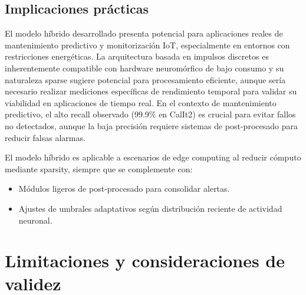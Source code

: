 \subsection{Implicaciones prácticas}
El modelo híbrido desarrollado presenta potencial para aplicaciones reales de mantenimiento predictivo y monitorización IoT, especialmente en entornos con restricciones energéticas. La arquitectura basada en impulsos discretos es inherentemente compatible con hardware neuromórfico de bajo consumo y su naturaleza sparse sugiere potencial para procesamiento eficiente, aunque sería necesario realizar mediciones específicas de rendimiento temporal para validar su viabilidad en aplicaciones de tiempo real. En el contexto de mantenimiento predictivo, el alto recall observado (99.9\% en CalIt2) es crucial para evitar fallos no detectados, aunque la baja precisión requiere sistemas de post-procesado para reducir falsas alarmas.

El modelo híbrido es aplicable a escenarios de edge computing al reducir cómputo mediante sparsity, siempre que se complemente con:
\begin{itemize}
    \item Módulos ligeros de post-procesado para consolidar alertas.
    \item Ajustes de umbrales adaptativos según distribución reciente de actividad neuronal.
\end{itemize}

\section{Limitaciones y consideraciones de validez}
